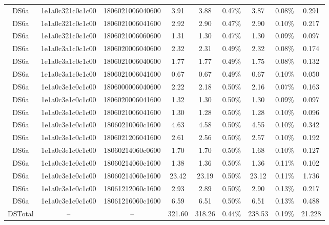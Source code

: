 \begin{tabular}{|c|c c|c|c c|c c|c|}
  DS6a & 1e1a0c321c0c1c00 & 1806021006040600 & 3.91 & 3.88 & 0.47\% & 3.87 & 0.08\% & 0.291 \\
  DS6a & 1e1a0c321c0c1c00 & 1806021006041600 & 2.92 & 2.90 & 0.47\% & 2.90 & 0.10\% & 0.217 \\
  DS6a & 1e1a0c321c0c1c00 & 1806021006060600 & 1.31 & 1.30 & 0.47\% & 1.30 & 0.09\% & 0.097 \\
  DS6a & 1e1a0c3a1c0c1c00 & 1806020006040600 & 2.32 & 2.31 & 0.49\% & 2.32 & 0.08\% & 0.174 \\
  DS6a & 1e1a0c3a1c0c1c00 & 1806021006040600 & 1.77 & 1.77 & 0.49\% & 1.75 & 0.08\% & 0.132 \\
  DS6a & 1e1a0c3a1c0c1c00 & 1806021006041600 & 0.67 & 0.67 & 0.49\% & 0.67 & 0.10\% & 0.050 \\
  DS6a & 1e1a0c3e1c0c1c00 & 1806000006040600 & 2.22 & 2.18 & 0.50\% & 2.16 & 0.07\% & 0.163 \\
  DS6a & 1e1a0c3e1c0c1c00 & 1806020006041600 & 1.32 & 1.30 & 0.50\% & 1.30 & 0.09\% & 0.097 \\
  DS6a & 1e1a0c3e1c0c1c00 & 1806021006041600 & 1.30 & 1.28 & 0.50\% & 1.28 & 0.10\% & 0.096 \\
  DS6a & 1e1a0c3e1c0c1c00 & 18060210060c1600 & 4.63 & 4.58 & 0.50\% & 4.55 & 0.10\% & 0.342 \\
  DS6a & 1e1a0c3e1c0c1c00 & 1806021206041600 & 2.61 & 2.56 & 0.50\% & 2.57 & 0.10\% & 0.192 \\
  DS6a & 1e1a0c3e1c0c1c00 & 18060214060c0600 & 1.70 & 1.70 & 0.50\% & 1.68 & 0.10\% & 0.127 \\
  DS6a & 1e1a0c3e1c0c1c00 & 18060214060c1600 & 1.38 & 1.36 & 0.50\% & 1.36 & 0.11\% & 0.102 \\
  DS6a & 1e1a0c3e1c0c1c00 & 18060214060e1600 & 23.42 & 23.19 & 0.50\% & 23.12 & 0.11\% & 1.736 \\
  DS6a & 1e1a0c3e1c0c1c00 & 18061212060c1600 & 2.93 & 2.89 & 0.50\% & 2.90 & 0.13\% & 0.217 \\
  DS6a & 1e1a0c3e1c0c1c00 & 18061216060c1600 & 6.59 & 6.51 & 0.50\% & 6.51 & 0.13\% & 0.488 \\
  DSTotal & -- & -- & 321.60 & 318.26 & 0.44\% & 238.53 & 0.19\% & 21.228 \\
\hline
\end{tabular}
